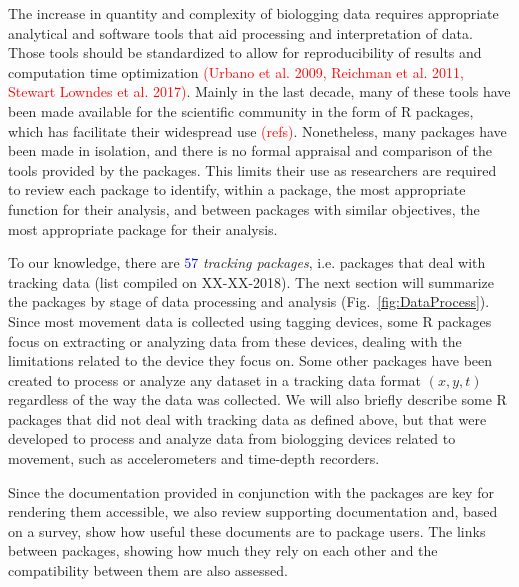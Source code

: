 \documentclass[a4paper,12pt]{article}
\begin{document}
The increase in quantity and complexity of biologging data requires appropriate analytical and software tools that aid processing and interpretation of data. Those tools should be standardized to allow for reproducibility of results and computation time optimization \textcolor{red}{(Urbano et al. 2009, Reichman et al. 2011, Stewart Lowndes et al. 2017)}. %
Mainly in the last decade, many of these tools have been made available for the scientific community in the form of R packages, which has facilitate their widespread use \textcolor{red}{(refs)}. Nonetheless, many packages have been made in isolation, and there is no formal appraisal and comparison of the tools provided by the packages. This limits their use as researchers are required to review each package to identify, within a package, the most appropriate function for their analysis, and between packages with similar objectives, the most appropriate package for their analysis. 

To our knowledge, there are \textcolor{blue}{$57$} \emph{tracking packages}, i.e. packages that deal with tracking data (list compiled on XX-XX-2018). The next section will summarize the packages by stage of data processing and analysis (Fig.~\ref{fig:DataProcess}). Since most movement data is collected using tagging devices, some R packages focus on extracting or analyzing data from these devices, dealing with the limitations related to the device they focus on. Some other packages have been created to process or analyze any dataset in a tracking data format $(x,y,t)$ regardless of the way the data was collected.  %
We will also briefly describe some R packages that did not deal with tracking data as defined above, but that were developed to process and analyze data from biologging devices related to movement, such as accelerometers and time-depth recorders. 

Since the documentation provided in conjunction with the packages are key for rendering them accessible, we also review supporting documentation and, based on a survey, show how useful these documents are to package users. The links between packages, showing how much they rely on each other and the compatibility between them are also assessed. 
\end{document}
